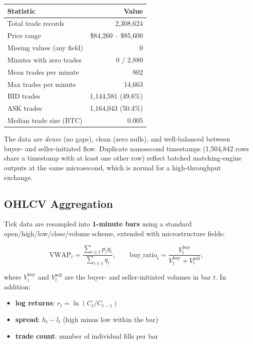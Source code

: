 \documentclass[11pt, a4paper]{article}
\begin{document}
\begin{center}
\begin{tabular}{lr}
\toprule
\textbf{Statistic} & \textbf{Value} \\
\midrule
Total trade records      & 2{,}308{,}624 \\
Price range              & \$84{,}260 -- \$85{,}600 \\
Missing values (any field) & 0 \\
Minutes with zero trades & 0 / 2{,}880 \\
Mean trades per minute   & 802 \\
Max trades per minute    & 14{,}663 \\
BID trades               & 1{,}144{,}581 (49.6\%) \\
ASK trades               & 1{,}164{,}043 (50.4\%) \\
Median trade size (BTC)  & 0.005 \\
\bottomrule
\end{tabular}
\end{center}

The data are \textit{dense} (no gaps), clean (zero nulls), and well-balanced
between buyer- and seller-initiated flow.  Duplicate nanosecond timestamps
(1{,}504{,}842 rows share a timestamp with at least one other row) reflect
batched matching-engine outputs at the same microsecond, which is normal
for a high-throughput exchange.

\subsection{OHLCV Aggregation}

Tick data are resampled into \textbf{1-minute bars} using a standard
open/high/low/close/volume scheme, extended with microstructure fields:

\[
\mathrm{VWAP}_t
  = \frac{\sum_{i \in t} p_i q_i}{\sum_{i \in t} q_i},
\qquad
\mathrm{buy\_ratio}_t
  = \frac{V^{\mathrm{buy}}_t}{V^{\mathrm{buy}}_t + V^{\mathrm{sell}}_t},
\]

\noindent where $V^{\mathrm{buy}}_t$ and $V^{\mathrm{sell}}_t$ are the
buyer- and seller-initiated volumes in bar $t$.  In addition:

\begin{itemize}[leftmargin=2em, itemsep=0pt]
  \item \textbf{log returns}: $r_t = \ln(C_t / C_{t-1})$
  \item \textbf{spread}: $h_t - l_t$ (high minus low within the bar)
  \item \textbf{trade count}: number of individual fills per bar
\end{itemize}
\end{document}
